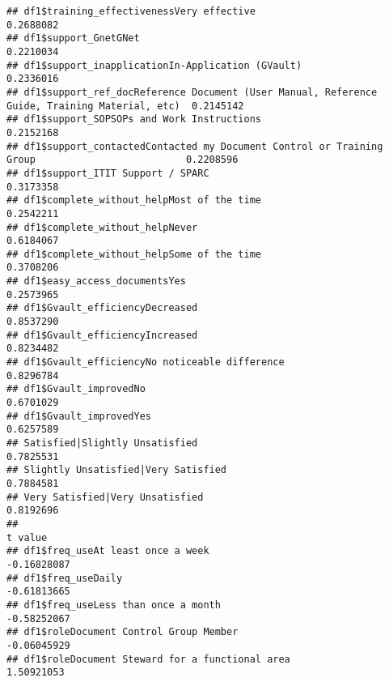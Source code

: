 \documentclass[]{article}
\begin{document}
\begin{verbatim}
## df1$training_effectivenessVery effective                                                      0.2688082
## df1$support_GnetGNet                                                                          0.2210034
## df1$support_inapplicationIn-Application (GVault)                                              0.2336016
## df1$support_ref_docReference Document (User Manual, Reference Guide, Training Material, etc)  0.2145142
## df1$support_SOPSOPs and Work Instructions                                                     0.2152168
## df1$support_contactedContacted my Document Control or Training Group                          0.2208596
## df1$support_ITIT Support / SPARC                                                              0.3173358
## df1$complete_without_helpMost of the time                                                     0.2542211
## df1$complete_without_helpNever                                                                0.6184067
## df1$complete_without_helpSome of the time                                                     0.3708206
## df1$easy_access_documentsYes                                                                  0.2573965
## df1$Gvault_efficiencyDecreased                                                                0.8537290
## df1$Gvault_efficiencyIncreased                                                                0.8234482
## df1$Gvault_efficiencyNo noticeable difference                                                 0.8296784
## df1$Gvault_improvedNo                                                                         0.6701029
## df1$Gvault_improvedYes                                                                        0.6257589
## Satisfied|Slightly Unsatisfied                                                                0.7825531
## Slightly Unsatisfied|Very Satisfied                                                           0.7884581
## Very Satisfied|Very Unsatisfied                                                               0.8192696
##                                                                                                  t value
## df1$freq_useAt least once a week                                                             -0.16828087
## df1$freq_useDaily                                                                            -0.61813665
## df1$freq_useLess than once a month                                                           -0.58252067
## df1$roleDocument Control Group Member                                                        -0.06045929
## df1$roleDocument Steward for a functional area                                                1.50921053

\end{verbatim}
\end{document}
